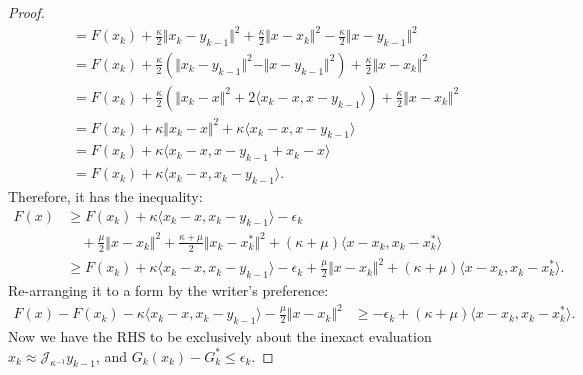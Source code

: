 \documentclass[12pt]{article}
\begin{document}
\begin{proof}
\begin{align*}
            &= 
            F(x_k) + \frac{\kappa}{2}\Vert x_k - y_{k - 1}\Vert^2
            + \frac{\kappa}{2}\Vert x - x_k\Vert^2 - \frac{\kappa}{2}\Vert x - y_{k - 1}\Vert^2
            \\
            &= 
            F(x_k) + 
            \frac{\kappa}{2}\left(
                \Vert x_k - y_{k - 1}\Vert^2 - \Vert x - y_{k - 1}\Vert^2
            \right)
            + \frac{\kappa}{2} \Vert x - x_k\Vert^2
            \\
            &= 
            F(x_k) + 
            \frac{\kappa}{2}\left(
                \Vert x_k - x\Vert^2 
                + 
                2\langle x_k - x, x - y_{k - 1} \rangle
            \right)
            + 
            \frac{\kappa}{2} \Vert x - x_k\Vert^2
            \\
            &= 
            F(x_k) + 
            \kappa\Vert x_k - x\Vert^2
            + 
            \kappa\langle x_k - x, x - y_{k - 1}\rangle
            \\
            &= 
            F(x_k) + 
            \kappa\langle x_k - x, x - y_{k - 1} + x_k - x\rangle
            \\
            &= F(x_k) + \kappa\langle x_k - x, x_k - y_{k - 1} \rangle. 
        \end{align*}
        Therefore, it has the inequality: 
        \begin{align*}
            F(x) 
            &\ge 
            F(x_k) + \kappa\langle x_k - x, x_k - y_{k - 1} \rangle
            - \epsilon_k
            \\&\quad 
                + \frac{\mu}{2}\Vert x - x_k\Vert^2
                + \frac{\kappa + \mu}{2}\Vert x_k - x_k^*\Vert^2
                + (\kappa + \mu)\langle x - x_k, x_k - x_k^*\rangle
            \\
            & \ge
            F(x_k) + \kappa\langle x_k - x, x_k - y_{k - 1} \rangle
            - \epsilon_k
            + \frac{\mu}{2}\Vert x - x_k\Vert^2
            + (\kappa + \mu)\langle x - x_k, x_k - x_k^*\rangle. 
        \end{align*}
        Re-arranging it to a form by the writer's preference:
        \begin{align*}
            F(x) - F(x_k) - \kappa\langle x_k - x, x_k - y_{k - 1} \rangle
            - \frac{\mu}{2}\Vert x - x_k\Vert^2
            &\ge 
            - \epsilon_k
            + (\kappa + \mu)\langle x - x_k, x_k - x_k^*\rangle. 
        \end{align*}
        Now we have the RHS to be exclusively about the inexact evaluation $x_k \approx \mathcal J_{\kappa^{-1}} y_{k - 1}$, and $G_k(x_k) - G^*_k \le \epsilon_k$. 
        \end{proof}
\end{document}
